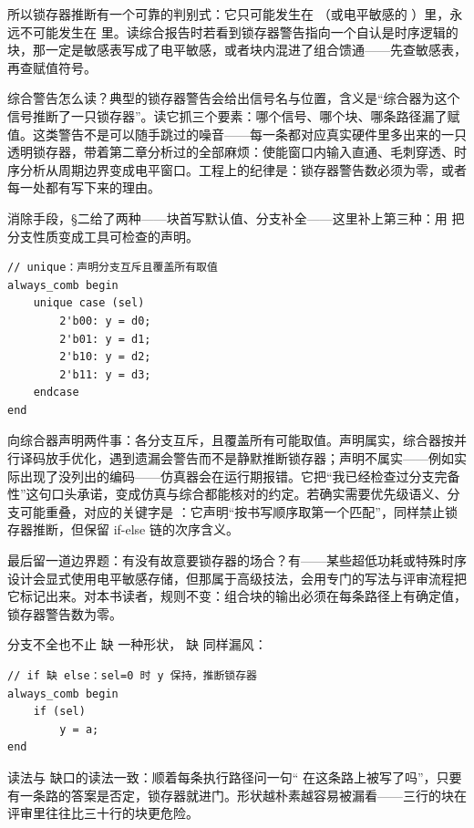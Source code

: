 所以锁存器推断有一个可靠的判别式：它只可能发生在 （或电平敏感的 ）里，永远不可能发生在  里。读综合报告时若看到锁存器警告指向一个自认是时序逻辑的块，那一定是敏感表写成了电平敏感，或者块内混进了组合馈通——先查敏感表，再查赋值符号。

综合警告怎么读？典型的锁存器警告会给出信号名与位置，含义是“综合器为这个信号推断了一只锁存器”。读它抓三个要素：哪个信号、哪个块、哪条路径漏了赋值。这类警告不是可以随手跳过的噪音——每一条都对应真实硬件里多出来的一只透明锁存器，带着第二章分析过的全部麻烦：使能窗口内输入直通、毛刺穿透、时序分析从周期边界变成电平窗口。工程上的纪律是：锁存器警告数必须为零，或者每一处都有写下来的理由。

消除手段，§二给了两种——块首写默认值、分支补全——这里补上第三种：用  把分支性质变成工具可检查的声明。

\begin{lstlisting}
// unique：声明分支互斥且覆盖所有取值
always_comb begin
    unique case (sel)
        2'b00: y = d0;
        2'b01: y = d1;
        2'b10: y = d2;
        2'b11: y = d3;
    endcase
end
\end{lstlisting}

 向综合器声明两件事：各分支互斥，且覆盖所有可能取值。声明属实，综合器按并行译码放手优化，遇到遗漏会警告而不是静默推断锁存器；声明不属实——例如实际出现了没列出的编码——仿真器会在运行期报错。它把“我已经检查过分支完备性”这句口头承诺，变成仿真与综合都能核对的约定。若确实需要优先级语义、分支可能重叠，对应的关键字是 ：它声明“按书写顺序取第一个匹配”，同样禁止锁存器推断，但保留 if-else 链的次序含义。

最后留一道边界题：有没有故意要锁存器的场合？有——某些超低功耗或特殊时序设计会显式使用电平敏感存储，但那属于高级技法，会用专门的写法与评审流程把它标记出来。对本书读者，规则不变：组合块的输出必须在每条路径上有确定值，锁存器警告数为零。

分支不全也不止  缺  一种形状， 缺  同样漏风：

\begin{lstlisting}
// if 缺 else：sel=0 时 y 保持，推断锁存器
always_comb begin
    if (sel)
        y = a;
end
\end{lstlisting}

读法与  缺口的读法一致：顺着每条执行路径问一句“ 在这条路上被写了吗”，只要有一条路的答案是否定，锁存器就进门。形状越朴素越容易被漏看——三行的块在评审里往往比三十行的块更危险。

